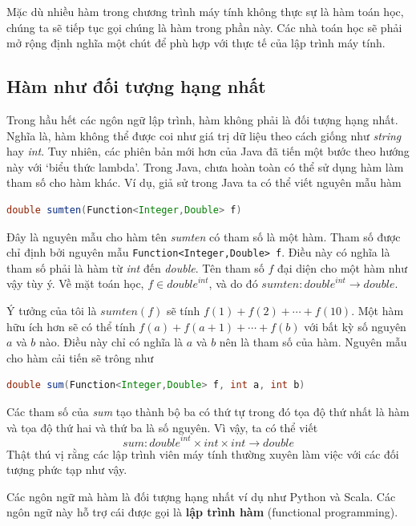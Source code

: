 Mặc dù nhiều hàm trong chương trình máy tính không thực sự là hàm toán học, chúng ta sẽ tiếp tục gọi chúng là hàm trong phần này. Các nhà toán học sẽ phải mở rộng định nghĩa một chút để phù hợp với thực tế của lập trình máy tính.

\subsection{Hàm như đối tượng hạng nhất}

Trong hầu hết các ngôn ngữ lập trình, hàm không phải là đối tượng hạng nhất. Nghĩa là, hàm không thể được coi như giá trị dữ liệu theo cách giống như \textit{string} hay \textit{int}. Tuy nhiên, các phiên bản mới hơn của Java đã tiến một bước theo hướng này với `biểu thức lambda'. Trong Java, chưa hoàn toàn có thể sử dụng hàm làm tham số cho hàm khác. Ví dụ, giả sử trong Java ta có thể viết nguyên mẫu hàm

\begin{lstlisting}[language=Java]
double sumten(Function<Integer,Double> f)
\end{lstlisting}

Đây là nguyên mẫu cho hàm tên \textit{sumten} có tham số là một hàm. Tham số được chỉ định bởi nguyên mẫu \texttt{Function<Integer,Double> f}. Điều này có nghĩa là tham số phải là hàm từ \textit{int} đến \textit{double}. Tên tham số $f$ đại diện cho một hàm như vậy tùy ý. Về mặt toán học, $f \in \mathit{double}^{\mathit{int}}$, và do đó $\mathit{sumten}\colon \mathit{double}^{\mathit{int}} \to \mathit{double}$.

Ý tưởng của tôi là $\mathit{sumten}(f)$ sẽ tính $f(1) + f(2) + \cdots + f(10)$. Một hàm hữu ích hơn sẽ có thể tính $f(a) + f(a+1) + \cdots + f(b)$ với bất kỳ số nguyên $a$ và $b$ nào. Điều này chỉ có nghĩa là $a$ và $b$ nên là tham số của hàm. Nguyên mẫu cho hàm cải tiến sẽ trông như

\begin{lstlisting}[language=Java]
double sum(Function<Integer,Double> f, int a, int b)
\end{lstlisting}

Các tham số của \textit{sum} tạo thành bộ ba có thứ tự trong đó tọa độ thứ nhất là hàm và tọa độ thứ hai và thứ ba là số nguyên. Vì vậy, ta có thể viết
\[
\mathit{sum}\colon \mathit{double}^{\mathit{int}} \times \mathit{int} \times \mathit{int} \to \mathit{double}
\]
Thật thú vị rằng các lập trình viên máy tính thường xuyên làm việc với các đối tượng phức tạp như vậy.

Các ngôn ngữ mà hàm là đối tượng hạng nhất ví dụ như Python và Scala. Các ngôn ngữ này hỗ trợ cái được gọi là \textbf{lập trình hàm} (functional programming).

